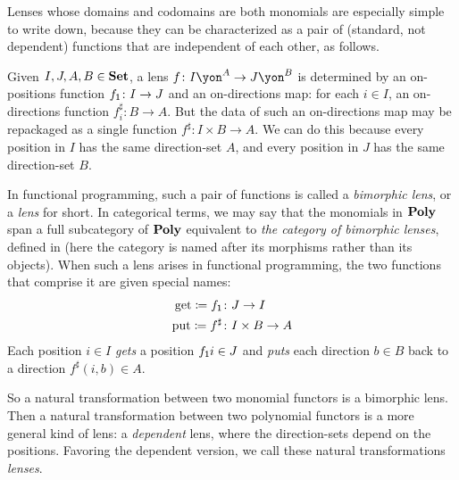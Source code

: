 \documentclass[Book-Poly]{subfiles}
\begin{document}

\begin{example} \label{subsec.poly.cat.morph.bimorphic-lens}
  Lenses whose domains and codomains are both monomials are especially simple to write down, because they can be characterized as a pair of (standard, not dependent) functions that are independent of each other, as follows.

  Given $I,J,A,B\in\mathbf{Set}$, a lens $f\colon I\yon^A\to J\yon^B$ is determined by an on-positions function $f_{\textsf{1}}\colon I\to J$ and an on-directions map: for each $i\in I$, an on-directions function $f^\sharp_i\colon B\to A$.
  But the data of such an on-directions map may be repackaged as a single function $f^\sharp\colon I\times B\to A$.
  We can do this because every position in $I$ has the same direction-set $A$, and every position in $J$ has the same direction-set $B$.

  In functional programming, such a pair of functions is called a \emph{bimorphic lens}, or a \emph{lens} for short.
  In categorical terms, we may say that the monomials in $\mathbf{Poly}$ span a full subcategory of $\mathbf{Poly}$ equivalent to \emph{the category of bimorphic lenses}, defined in \cite{hedges2018limits} (here the category is named after its morphisms rather than its objects).
  When such a lens arises in functional programming, the two functions that comprise it are given special names:
  \begin{equation}\label{eqn.bimorphic_lens}
    \begin{aligned}
      \mathrm{get}\coloneqq f_{\textsf{1}} &\colon J\to I\\
      \mathrm{put}\coloneqq f^\sharp &\colon I\times B\to A
    \end{aligned}
  \end{equation}
  Each position $i\in I$ \emph{gets} a position $f_{\textsf{1}}i\in J$ and \emph{puts} each direction $b\in B$ back to a direction $f^\sharp(i,b)\in A$.

  So a natural transformation between two monomial functors is a bimorphic lens.
  Then a natural transformation between two polynomial functors is a more general kind of lens: a \emph{dependent} lens, where the direction-sets depend on the positions.
  Favoring the dependent version, we call these natural transformations \emph{lenses}.
\end{example}
\end{document}
